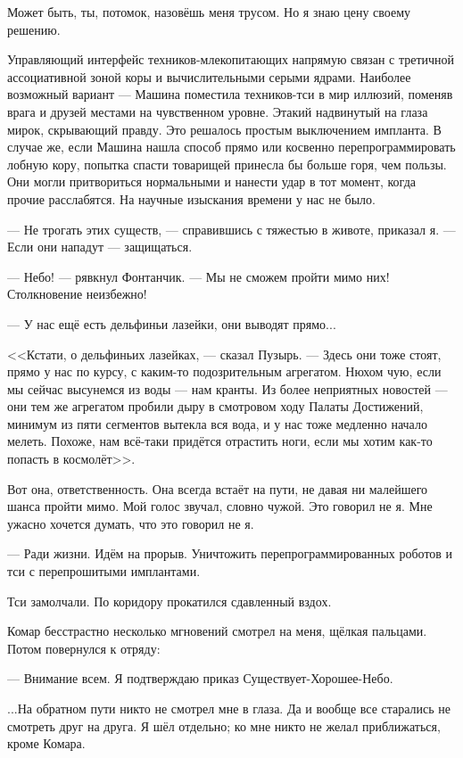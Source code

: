 Может быть, ты, потомок, назовёшь меня трусом.
Но я знаю цену своему решению.

Управляющий интерфейс техников-млекопитающих напрямую связан с третичной ассоциативной зоной коры и вычислительными серыми ядрами.
Наиболее возможный вариант --- Машина поместила техников-тси в мир иллюзий, поменяв врага и друзей местами на чувственном уровне.
Этакий надвинутый на глаза мирок, скрывающий правду.
Это решалось простым выключением импланта.
В случае же, если Машина нашла способ прямо или косвенно перепрограммировать лобную кору, попытка спасти товарищей принесла бы больше горя, чем пользы.
Они могли притвориться нормальными и нанести удар в тот момент, когда прочие расслабятся.
На научные изыскания времени у нас не было.

--- Не трогать этих существ, --- справившись с тяжестью в животе, приказал я.
--- Если они нападут --- защищаться.

--- Небо! --- рявкнул Фонтанчик.
--- Мы не сможем пройти мимо них!
Столкновение неизбежно!

--- У нас ещё есть дельфиньи лазейки, они выводят прямо...

<<Кстати, о дельфиньих лазейках, --- сказал Пузырь.
--- Здесь они тоже стоят, прямо у нас по курсу, с каким-то подозрительным агрегатом.
Нюхом чую, если мы сейчас высунемся из воды --- нам кранты.
Из более неприятных новостей --- они тем же агрегатом пробили дыру в смотровом ходу Палаты Достижений, минимум из пяти сегментов вытекла вся вода, и у нас тоже медленно начало мелеть.
Похоже, нам всё-таки придётся отрастить ноги, если мы хотим как-то попасть в космолёт>>.

Вот она, ответственность.
Она всегда встаёт на пути, не давая ни малейшего шанса пройти мимо.
Мой голос звучал, словно чужой.
Это говорил не я.
Мне ужасно хочется думать, что это говорил не я.

--- Ради жизни.
Идём на прорыв.
Уничтожить перепрограммированных роботов и тси с перепрошитыми имплантами.

Тси замолчали.
По коридору прокатился сдавленный вздох.

Комар бесстрастно несколько мгновений смотрел на меня, щёлкая пальцами.
Потом повернулся к отряду:

--- Внимание всем.
Я подтверждаю приказ Существует-Хорошее-Небо.

...На обратном пути никто не смотрел мне в глаза.
Да и вообще все старались не смотреть друг на друга.
Я шёл отдельно;
ко мне никто не желал приближаться, кроме Комара.

